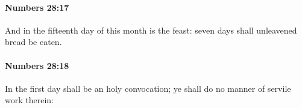 		\paragraph{Numbers 28:17} %
			\label{NUMBERS-28-17}

			And in the fifteenth day of this month is the feast: seven days shall unleavened bread be eaten.


		\paragraph{Numbers 28:18} %
			\label{NUMBERS-28-18}

			In the first day shall be an holy convocation; ye shall do no manner of servile work therein:


